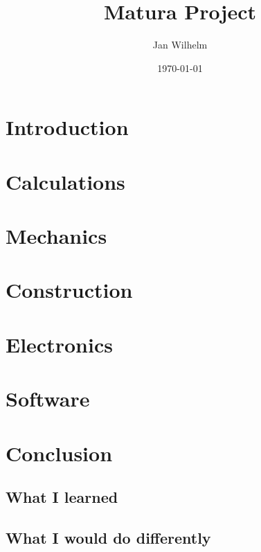 \documentclass[11pt]{report}
\title{Matura Project}
\author{Jan Wilhelm}
\date\today
\begin{document}
    \maketitle

    \tableofcontents
    \newpage


    \chapter{Introduction}\label{ch:introduction}
    


    \chapter{Calculations}\label{ch:calculations}
    


    \chapter{Mechanics}\label{ch:mechanics}
    


    \chapter{Construction}\label{ch:construction}
    


    \chapter{Electronics}\label{ch:electronics}
    


    \chapter{Software}\label{ch:software}
    


    \chapter{Conclusion}\label{ch:conclusion}


    \section{What I learned}\label{sec:learned}


    \section{What I would do differently}\label{sec:different}
\end{document}
